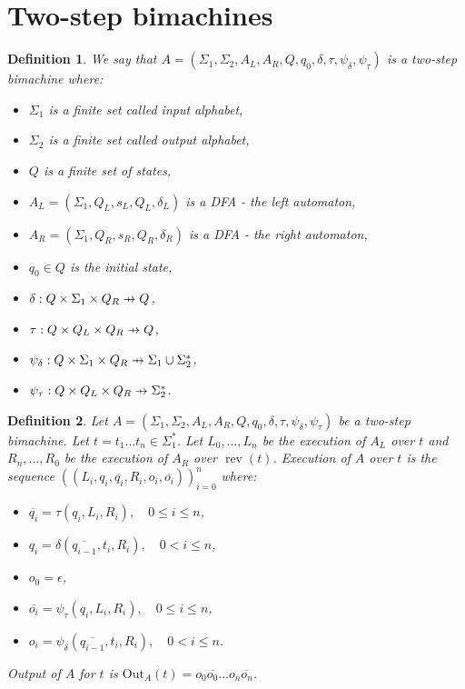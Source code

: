 \documentclass{article}
\newtheorem{definition}{Definition}[section]
\newcommand\pfun{\mathrel{\ooalign{\hfil$\mapstochar\mkern5mu$\hfil\cr$\to$\cr}}}
\DeclareMathOperator{\rev}{rev}
\begin{document}
	\section{Two-step bimachines} \label{section:TSBM}
	\begin{definition} \label{def:two-step_bimachine}
		We say that $A=(\Sigma_1, \Sigma_2, A_L, A_R, Q, q_0, \delta, \tau, \psi_\delta, \psi_\tau)$ is a two-step bimachine where:
		\begin{itemize}
			\item $\Sigma_1$ is a finite set called input alphabet,
			\item $\Sigma_2$ is a finite set called output alphabet,
			\item $Q$ is a finite set of states,
			\item $A_L=(\Sigma_1, Q_L, s_L, Q_L, \delta_L)$ is a DFA - the left automaton,
			\item $A_R=(\Sigma_1, Q_R, s_R, Q_R, \delta_R)$ is a DFA - the right automaton,
			\item $q_0\in Q$ is the initial state,
			\item $\delta: Q\times \Sigma_1\times Q_R \pfun Q$,
			\item $\tau: Q\times Q_L\times Q_R \pfun Q$,
			\item $\psi_\delta: Q\times \Sigma_1\times Q_R \pfun \Sigma_1\cup\Sigma_2^*$,
			\item $\psi_\tau: Q\times Q_L\times Q_R \pfun \Sigma_2^*$.
		\end{itemize}
	\end{definition}

	\begin{definition} \label{def:two-step_bimachine_exec}
		Let $A=(\Sigma_1, \Sigma_2, A_L, A_R, Q, q_0, \delta, \tau, \psi_\delta, \psi_\tau)$ be a two-step bimachine.
		Let $t=t_1\ldots t_n\in \Sigma_1^*$.
		Let $L_0, \ldots, L_n$ be the execution of $A_L$ over $t$ and
		$R_n, \ldots, R_0$ be the execution of $A_R$ over $\rev(t)$.
		Execution of $A$ over $t$ is the sequence $((L_i, q_i, \overline{q_i}, R_i, o_i, \overline{o_i}))_{i=0}^n$ where:
		\begin{itemize}
			\item \( \overline{q_i} = \tau(q_i, L_i, R_i), \quad 0\le i\le n \),
			\item \( q_i = \delta(\overline{q_{i-1}}, t_i, R_i), \quad 0 < i\le n \),
			\item \( o_0 = \epsilon \),
			\item \( \overline{o_i} = \psi_\tau(q_i, L_i, R_i), \quad 0\le i\le n \),
			\item \( o_i = \psi_\delta(\overline{q_{i-1}}, t_i, R_i), \quad 0 < i\le n \).
		\end{itemize}
		Output of $A$ for $t$ is $\mathrm{Out}_A(t)=o_0\overline{o_0}\ldots o_n\overline{o_n}$.
	\end{definition}
\end{document}
